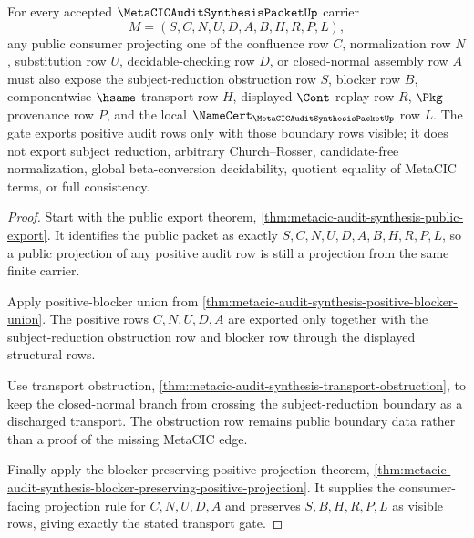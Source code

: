 \begin{theorem}
\label{thm:metacic-audit-synthesis-public-transport-gate}
For every accepted $\MetaCICAuditSynthesisPacketUp$ carrier
$$
M=(S,C,N,U,D,A,B,H,R,P,L),
$$
any public consumer projecting one of the confluence row $C$, normalization row $N$, substitution row $U$, decidable-checking row $D$, or closed-normal assembly row $A$ must also expose the subject-reduction obstruction row $S$, blocker row $B$, componentwise $\hsame$ transport row $H$, displayed $\Cont$ replay row $R$, $\Pkg$ provenance row $P$, and the local $\NameCert_{\MetaCICAuditSynthesisPacketUp}$ row $L$. The gate exports positive audit rows only with those boundary rows visible; it does not export subject reduction, arbitrary Church--Rosser, candidate-free normalization, global beta-conversion decidability, quotient equality of MetaCIC terms, or full consistency.
\end{theorem}
\begin{proof}
Start with the public export theorem, \autoref{thm:metacic-audit-synthesis-public-export}. It identifies the public packet as exactly $S,C,N,U,D,A,B,H,R,P,L$, so a public projection of any positive audit row is still a projection from the same finite carrier.

Apply positive-blocker union from \autoref{thm:metacic-audit-synthesis-positive-blocker-union}. The positive rows $C,N,U,D,A$ are exported only together with the subject-reduction obstruction row and blocker row through the displayed structural rows.

Use transport obstruction, \autoref{thm:metacic-audit-synthesis-transport-obstruction}, to keep the closed-normal branch from crossing the subject-reduction boundary as a discharged transport. The obstruction row remains public boundary data rather than a proof of the missing MetaCIC edge.

Finally apply the blocker-preserving positive projection theorem, \autoref{thm:metacic-audit-synthesis-blocker-preserving-positive-projection}. It supplies the consumer-facing projection rule for $C,N,U,D,A$ and preserves $S,B,H,R,P,L$ as visible rows, giving exactly the stated transport gate.
\end{proof}

